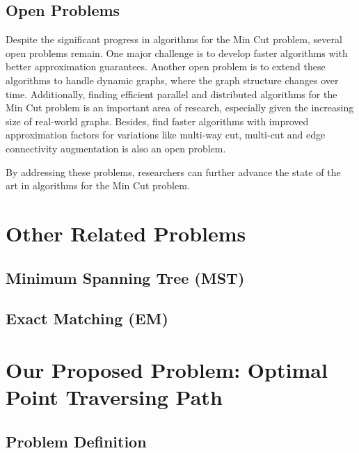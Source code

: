 \documentclass[12pt]{article}
\theoremstyle{plain}
\begin{document}

\subsection{Open Problems}

Despite the significant progress in algorithms for the Min Cut problem, several open problems remain. One major challenge is to develop faster algorithms with better approximation guarantees. Another open problem is to extend these algorithms to handle dynamic graphs, where the graph structure changes over time. Additionally, finding efficient parallel and distributed algorithms for the Min Cut problem is an important area of research, especially given the increasing size of real-world graphs. Besides, find faster algorithms with improved approximation factors for variations like multi-way cut, multi-cut and edge connectivity augmentation is also an open problem.

By addressing these problems, researchers can further advance the state of the art in algorithms for the Min Cut problem.

\section{Other Related Problems}

\subsection{Minimum Spanning Tree (MST)}

\subsection{Exact Matching (EM)}

\section{Our Proposed Problem: Optimal Point Traversing Path}

\subsection{Problem Definition}
\end{document}

